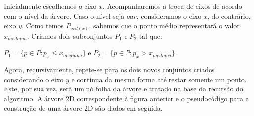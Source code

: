 

Inicialmente escolhemos o eixo $x$. Acompanharemos a troca de eixos de acordo com o nível da árvore.
Caso o nível seja $par$, consideramos o eixo $x$, do contrário, eixo $y$.
Como temos $P_{ord(x)}$, sabemos que o ponto médio representará o valor $x_{mediana}$.
Criamos dois subconjuntos $P_1$ e $P_2$ tal que:

    $P_1 = \{p \in P : p_x \leq x_{mediana}\}$ e $P_2 = \{p \in P : p_x > x_{mediana}\}$.

Agora, recursivamente, repete-se para os dois novos conjuntos criados considerando o eixo $y$ e 
continua da mesma forma até restar somente um ponto. Este, por sua vez, será um nó folha da árvore e
tratado na base da recursão do algoritmo. A árvore 2D correspondente à figura anterior e o pseudocódigo
para a construção de uma árvore 2D são dados em seguida.


